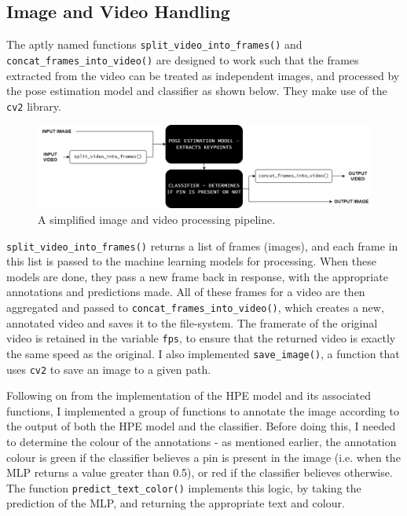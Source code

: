 \documentclass[a4paper, oneside, 11pt]{article}
\begin{document}
\subsection{Image and Video Handling}

The aptly named functions \texttt{split\_video\_into\_frames()} and \texttt{concat\_frames\_into\_video()} are designed to work such that the frames extracted from the video can be treated as independent images, and processed by the pose estimation model and classifier as shown below. They make use of the \texttt{cv2} library.

\bigskip
\begin{figure}[ht]
    \centering
    \includegraphics[scale = 0.23]{img/video-processing-pipeline.drawio.png}
    \caption{A simplified image and video processing pipeline.}
    \label{fig:image-video-pipeline}
\end{figure}

\bigskip
\noindent
\texttt{split\_video\_into\_frames()} returns a list of frames (images), and each frame in this list is passed to the machine learning models for processing. When these models are done, they pass a new frame back in response, with the appropriate annotations and predictions made. All of these frames for a video are then aggregated and passed to \texttt{concat\_frames\_into\_video()}, which creates a new, annotated video and saves it to the file-system. The framerate of the original video is retained in the variable \texttt{fps}, to ensure that the returned video is exactly the same speed as the original. I also implemented \texttt{save\_image()}, a function that uses \texttt{cv2} to save an image to a given path.

\bigskip
\noindent
Following on from the implementation of the HPE model and its associated functions, I implemented a group of functions to annotate the image according to the output of both the HPE model and the classifier. Before doing this, I needed to determine the colour of the annotations - as mentioned earlier, the annotation colour is green if the classifier believes a pin is present in the image (i.e. when the MLP returns a value greater than 0.5), or red if the classifier believes otherwise. The function \texttt{predict\_text\_color()} implements this logic, by taking the prediction of the MLP, and returning the appropriate text and colour.
\end{document}
